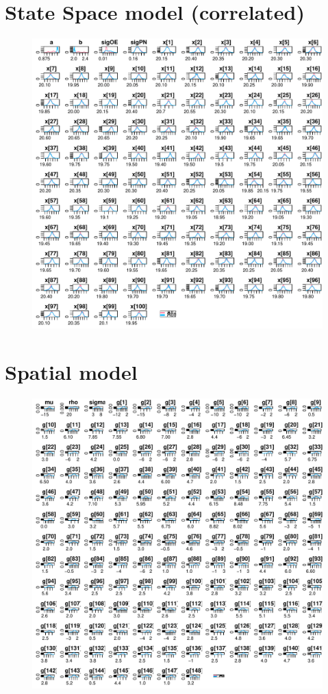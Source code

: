 \documentclass{article}
\begin{document}
\section{State Space model (correlated)}
\begin{figure}[h]
\centerline{\includegraphics[scale=1.0]{StateSpacemodelcorrelated}}
\end{figure}
\thispagestyle{empty}
\clearpage

\section{Spatial model}
\begin{figure}[h]
\centerline{\includegraphics[scale=1.0]{Spatialmodel}}
\end{figure}
\thispagestyle{empty}
\clearpage
\end{document}
